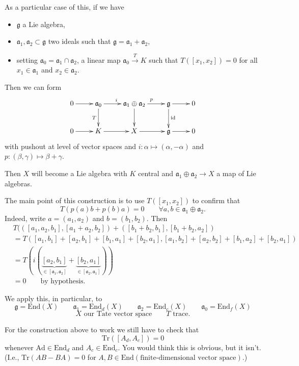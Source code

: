 \noindent
As a particular case of this,
if we have
\begin{itemize}
\item $\mathfrak{g}$ a Lie algebra,
\item $\mathfrak{a}_1, \mathfrak{a}_2 \subset \mathfrak{g}$
two ideals such that $\mathfrak{g}=\mathfrak{a}_1 + \mathfrak{a}_2$,
\item setting $\mathfrak{a}_0=\mathfrak{a}_1 \cap \mathfrak{a}_2$,
a linear map $\mathfrak{a}_0 \xrightarrow{T}K$
such that $T([x_1,x_2])=0$ for all
$x_1 \in \mathfrak{a}_1$ and $x_2 \in \mathfrak{a}_2$.
\end{itemize}

\noindent
Then we can form
$$
\xymatrix{
0\ar[r]&\mathfrak{a}_0\ar[d]_T\ar[r]^i
&\mathfrak{a}_1 \oplus \mathfrak{a}_2\ar[d]\ar[r]^p
&\mathfrak{g}\ar[r]\ar[d]^{\text{id}}&0\\
0\ar[r]& K\ar[r]& X\ar[r]&\mathfrak{g}\ar[r]&0
}
$$
\noindent
with pushout at level of vector spaces
and $i:\alpha \mapsto (\alpha,-\alpha)$ 
and $p:(\beta,\gamma)\mapsto \beta+\gamma$.

\begin{exercise}
\label{exercise-central-extension}
Then $X$ will become a Lie algebra
with $K$ central and
$\mathfrak{a}_1 \oplus \mathfrak{a}_2 \to X$
a map of Lie algebras.
\end{exercise}

\noindent
The main point of this construction
is to use $T([x_1,x_2])$
to confirm that
$$
T(p(a)b+p(b)a)=0\qquad \forall a,b \in \mathfrak{a}_1 \oplus \mathfrak{a}_2.
$$
Indeed, write $a=(a_1,a_2)$ and $b=(b_1,b_2)$.
Then
\begin{align*}
&T(([a_1,a_2,b_1],[a_1+a_2,b_2])+([b_1+b_2,b_1],[b_1+b_2,a_2])\\
&=T([a_1,b_1]+[a_2,b_1]+[b_1,a_1]+[b_2,a_1],
[a_1,b_2]+[a_2,b_2]+[b_1,a_2]+[b_2,a_1])\\
&=T(i(\underbrace{[a_2,b_1]}_{\in[\mathfrak{a}_1,\mathfrak{a}_2]}+
\underbrace{[b_2,a_1]}_{\in[\mathfrak{a}_2,\mathfrak{a}_1]}))\\
&=0\qquad \text{by hypothesis.}
\end{align*}

\medskip\noindent
We apply this, in particular, to
$$
\mathfrak{g}=\text{End}(X)
\qquad \mathfrak{a}_1=\text{End}_d(X)
\qquad \mathfrak{a}_2=\text{End}_c(X)
\qquad \mathfrak{a}_0=\text{End}_f(X)
$$
$$
X \text{ our Tate vector space}\qquad 
T \text{ trace}.
$$

\noindent
For the construction above to work
we still have to check that
$$
\text{Tr}([A_d,A_c])=0
$$
whenever $\text{Ad} \in \text{End}_d$ and
$A_c \in \text{End}_c$.
You would think this is obvious,
but it isn't.
(I.e., $\text{Tr}(AB-BA)=0$ for $A,B \in \text{End}(\text{finite-dimensional
vector space})$.)

